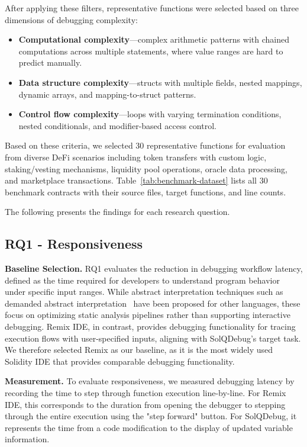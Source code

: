 \documentclass[pdflatex,sn-basic]{sn-jnl}%
\theoremstyle{thmstyleone}%
\theoremstyle{thmstyletwo}%
\theoremstyle{thmstylethree}%
\begin{document}
After applying these filters, representative functions were selected based on three dimensions of debugging complexity:
\begin{itemize}
  \item \textbf{Computational complexity}---complex arithmetic patterns with
        chained computations across multiple statements, where value ranges
        are hard to predict manually.
  \item \textbf{Data structure complexity}---structs with multiple fields, nested
        mappings, dynamic arrays, and mapping-to-struct patterns.
  \item \textbf{Control flow complexity}---loops with varying termination conditions,
        nested conditionals, and modifier-based access control.
\end{itemize}
Based on these criteria, we selected 30 representative functions for evaluation from diverse DeFi scenarios including token transfers
with custom logic, staking/vesting mechanisms, liquidity pool operations, oracle
data processing, and marketplace transactions.
Table~\ref{tab:benchmark-dataset} lists all 30 benchmark contracts with their
source files, target functions, and line counts.

The following presents the findings for each research question.



\subsection{RQ1 - Responsiveness}
\noindent\textbf{Baseline Selection.}
RQ1 evaluates the reduction in debugging workflow latency, defined as the time required for developers to understand program behavior under specific input ranges.
While abstract interpretation techniques such as demanded abstract interpretation~\citep{daig} have been proposed for other languages,
these focus on optimizing static analysis pipelines rather than supporting interactive debugging.
Remix IDE, in contrast, provides debugging functionality for tracing execution flows with user-specified inputs, aligning with SolQDebug's target task.
We therefore selected Remix as our baseline, as it is the most widely used Solidity IDE that provides comparable debugging functionality.

\smallskip
\noindent\textbf{Measurement.}
To evaluate responsiveness, we measured debugging latency by recording the time to step through function execution line-by-line.
For Remix IDE, this corresponds to the duration from opening the debugger to stepping through the entire execution using the "step forward" button.
For SolQDebug, it represents the time from a code modification to the display of updated variable information.
\end{document}
